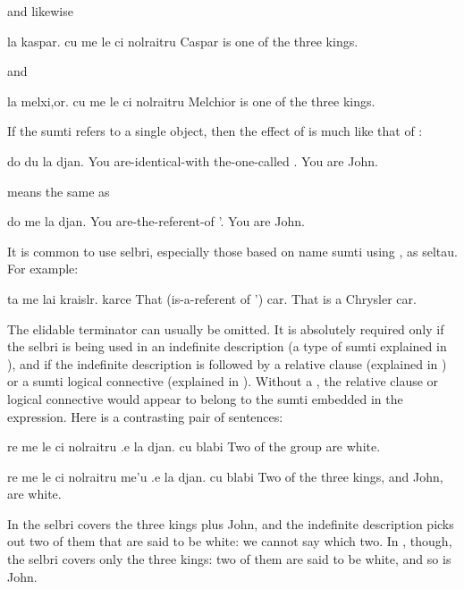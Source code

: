 {\noindent}and likewise
\begin{example}
la kaspar. cu me le ci nolraitru\n
Caspar is one of the three kings.
\end{example}

{\noindent}and
\begin{example}
la melxi,or. cu me le ci nolraitru\n
Melchior is one of the three kings.
\end{example}

If the sumti refers to a single object, then the effect of
     is much like that of :
\begin{example}
do du la djan.\n
You are-identical-with the-one-called .\n
You are John.
\end{example}

{\noindent}means the same as
\begin{example}
do me la djan.\n
You are-the-referent-of '.\n
You are John.
\end{example}

It is common to use  selbri, especially those based on
    name sumti using , as seltau. For example:
\begin{example}
ta me lai kraislr.  karce\n
That (is-a-referent of ') car.\n
That is a Chrysler car.
\end{example}

The elidable terminator  can usually be omitted. It is
    absolutely required only if the  selbri is being used in
    an indefinite description (a type of sumti explained in ), and if the indefinite
    description is followed by a relative clause (explained in ) or a sumti logical connective
    (explained in ). Without a
    , the relative clause or logical connective would
    appear to belong to the sumti embedded in the 
    expression. Here is a contrasting pair of sentences:
\begin{example}
re me le ci nolraitru .e la djan.  cu blabi\n
Two of the group  are white.
\end{example}

\begin{example}
re me le ci nolraitru me'u .e la djan. cu blabi\n
Two of the three kings, and John, are white.
\end{example}

In  the  selbri
    covers the three kings plus John, and the indefinite
    description picks out two of them that are said to be white: we
    cannot say which two. In ,
    though, the  selbri covers only the three kings: two of
    them are said to be white, and so is John.

